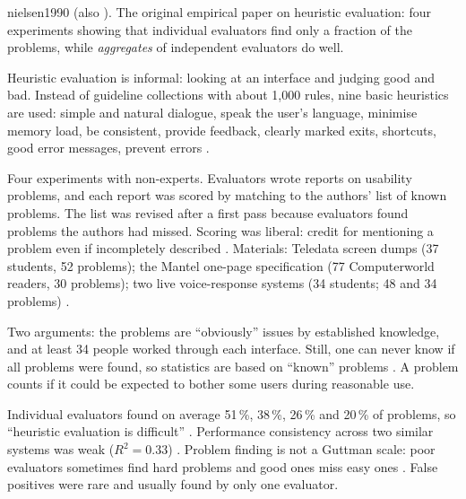 \begin{papercard}{nielsen1990}
  (also ). The original empirical paper on heuristic evaluation: four experiments showing that individual evaluators find only a fraction of the problems, while \emph{aggregates} of independent evaluators do well.

 Heuristic evaluation is informal: looking at an interface and judging good and bad. Instead of guideline collections with about 1{,}000 rules, nine basic heuristics are used: simple and natural dialogue, speak the user's language, minimise memory load, be consistent, provide feedback, clearly marked exits, shortcuts, good error messages, prevent errors .

 Four experiments with non-experts. Evaluators wrote reports on usability problems, and each report was scored by matching to the authors' list of known problems. The list was revised after a first pass because evaluators found problems the authors had missed. Scoring was liberal: credit for mentioning a problem even if incompletely described . Materials: Teledata screen dumps (37 students, 52 problems); the Mantel one-page specification (77 Computerworld readers, 30 problems); two live voice-response systems (34 students; 48 and 34 problems) .

 Two arguments: the problems are ``obviously'' issues by established knowledge, and at least 34 people worked through each interface. Still, one can never know if all problems were found, so statistics are based on ``known'' problems . A problem counts if it could be expected to bother some users during reasonable use.

 Individual evaluators found on average 51\,\%, 38\,\%, 26\,\% and 20\,\% of problems, so ``heuristic evaluation is difficult'' . Performance consistency across two similar systems was weak ($R^2=0.33$) . Problem finding is not a Guttman scale: poor evaluators sometimes find hard problems and good ones miss easy ones . False positives were rare and usually found by only one evaluator.


\end{papercard}

